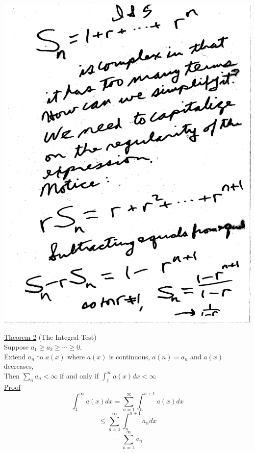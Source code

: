 \documentclass[10pt,a4paper]{article}
\begin{document}
{{\includegraphics[scale=.5]{Pages/IS_5}




\normalsize

\newpage

\noindent \underline{Theorem 2} (The Integral Test)
\vspace{5mm}
\\ Suppose $a_1 \geq a_2 \geq \cdots \geq 0$.
\\ Extend $a_n$ to $a(x)$ where $a(x)$ is continuous,
$a(n) = a_n$ and $a(x)$ decreases,
\\ Then $\sum_n a_n < \infty$ if and only if $\int_{1}^{\infty} a(x) dx < \infty$
\vspace{5mm}
\\ \underline{Proof}
$$\int_{1}^{\infty} a(x) dx = \sum_{n=1}^{\infty} \int_{n}^{n+1} a(x) dx$$
$$ \leq \sum_{n=1}^{\infty} \int_{n}^{n+1} a_n dx$$
$$ = \sum_{n=1}^{\infty} a_n $$

}}
\end{document}
